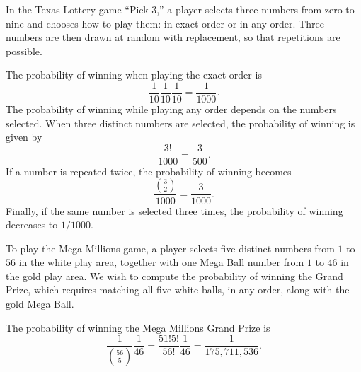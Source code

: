 \begin{example}
In the Texas Lottery game ``Pick $3$,'' a player selects three numbers from zero to nine and chooses how to play them: in exact order or in any order.
Three numbers are then drawn at random with replacement, so that repetitions are possible.

The probability of winning when playing the exact order is
\begin{equation*}
\frac{1}{10} \frac{1}{10} \frac{1}{10}
= \frac{1}{1000} .
\end{equation*}
The probability of winning while playing any order depends on the numbers selected.
When three distinct numbers are selected, the probability of winning is given by
\begin{equation*}
\frac{3!}{1000} = \frac{3}{500} .
\end{equation*}
If a number is repeated twice, the probability of winning becomes
\begin{equation*}
\frac{\binom{3}{2}}{1000} = \frac{3}{1000} .
\end{equation*}
Finally, if the same number is selected three times, the probability of winning decreases to $1/1000$.
\end{example}

\begin{example}
To play the Mega Millions game, a player selects five distinct numbers from $1$ to $56$ in the white play area, together with one Mega Ball number from $1$ to $46$ in the gold play area.
We wish to compute the probability of winning the Grand Prize, which requires matching all five white balls, in any order, along with the gold Mega Ball.

The probability of winning the Mega Millions Grand Prize is
\begin{equation*}
\frac{1}{\binom{56}{5}} \frac{1}{46}
= \frac{51!5!}{56!} \frac{1}{46}
= \frac{1}{175{,}711{,}536} .
\end{equation*}
\end{example}

